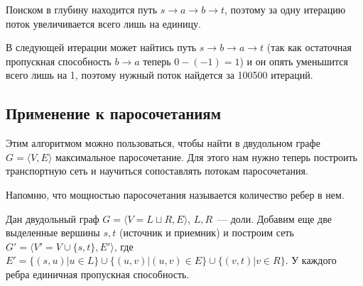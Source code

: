 \begin{example}
\begin{center}
	\end{center}
	Поиском в глубину находится путь $s\to a\to b\to t$, поэтому за одну итерацию поток увеличивается всего лишь на единицу.

	В следующей итерации может найтись путь $s\to b\to a\to t$ (так как остаточная пропускная способность $b\to a$ теперь $0-(-1)=1$) и он опять уменьшится всего лишь на 1, поэтому нужный поток найдется за 100500 итераций.
\end{example}

\subsection{Применение к паросочетаниям}
Этим алгоритмом можно пользоваться, чтобы найти в двудольном графе $G=\langle V,E\rangle$ максимальное паросочетание. Для этого нам нужно теперь построить транспортную сеть и научиться сопоставлять потокам паросочетания.

Напомню, что мощностью паросочетания называется количество ребер в нем.

Дан двудольный граф $G=\langle V=L\sqcup R,E\rangle$, $L,R$~--- доли. Добавим еще две выделенные вершины $s,t$ (источник и приемник) и построим сеть $G'=\langle V'=V\cup\{s,t\},E'\rangle$, где $E'=\{(s,u)|u\in L\}\cup\{(u,v)|(u,v)\in E\}\cup\{(v,t)|v\in R\}$. У каждого ребра единичная пропускная способность.

